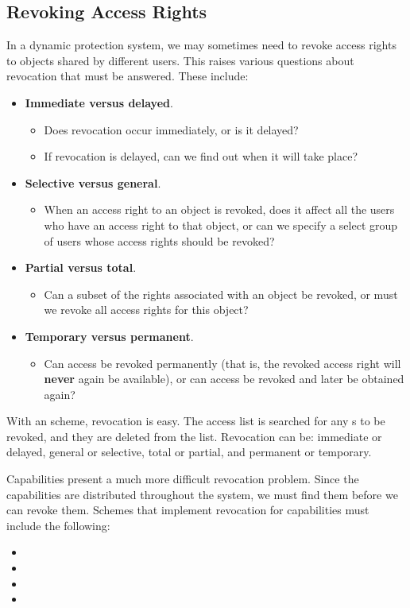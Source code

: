 \subsection{Revoking Access Rights}\label{subsec:Revoking_Access_Rights}
In a dynamic protection system, we may sometimes need to revoke access rights to objects shared by different users.
This raises various questions about revocation that must be answered.
These include:
\begin{itemize}[noitemsep]
\item \textbf{Immediate versus delayed}.
  \begin{itemize}[noitemsep]
  \item Does revocation occur immediately, or is it delayed?
  \item If revocation is delayed, can we find out when it will take place?
  \end{itemize}
\item \textbf{Selective versus general}.
  \begin{itemize}[noitemsep]
  \item When an access right to an object is revoked, does it affect all the users who have an access right to that object, or can we specify a select group of users whose access rights should be revoked?
  \end{itemize}
\item \textbf{Partial versus total}.
  \begin{itemize}[noitemsep]
  \item Can a subset of the rights associated with an object be revoked, or must we revoke all access rights for this object?
  \end{itemize}
\item \textbf{Temporary versus permanent}.
  \begin{itemize}[noitemsep]
  \item Can access be revoked permanently (that is, the revoked access right will \textbf{never} again be available), or can access be revoked and later be obtained again?
  \end{itemize}
\end{itemize}

With an  scheme, revocation is easy.
The access list is searched for any s to be revoked, and they are deleted from the list.
Revocation can be: immediate or delayed, general or selective, total or partial, and permanent or temporary.

Capabilities present a much more difficult revocation problem.
Since the capabilities are distributed throughout the system, we must find them before we can revoke them.
Schemes that implement revocation for capabilities must include the following:
\begin{itemize}[noitemsep]
\item {}
\item {}
\item {}
\item {}
\end{itemize}


